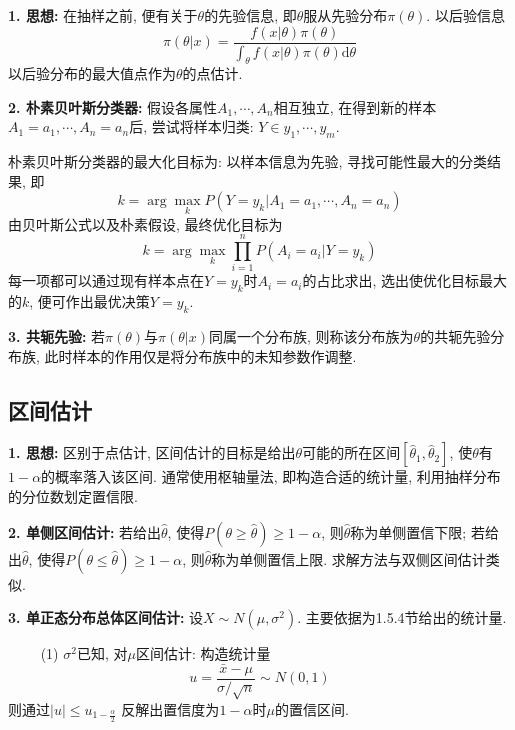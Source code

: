 \textbf{1. 思想: }在抽样之前, 便有关于$\theta$的先验信息, 即$\theta$服从先验分布$\pi(\theta)$. 以后验信息
\begin{equation*}
    \pi(\theta|x)=\frac{f(x|\theta)\pi(\theta)}{\int_\theta f(x|\theta)\pi(\theta)\mathrm{d} \theta}
\end{equation*}
以后验分布的最大值点作为$\theta$的点估计.

\textbf{2. 朴素贝叶斯分类器: }假设各属性$A_1,\cdots,A_n$相互独立, 在得到新的样本$A_1=a_1,\cdots,A_n=a_n$后, 尝试将样本归类: $Y \in {y_1,\cdots,y_m}$.

朴素贝叶斯分类器的最大化目标为: 以样本信息为先验, 寻找可能性最大的分类结果, 即
\begin{equation*}
    k=\arg\max\limits_{k}P(Y=y_k|A_1=a_1,\cdots,A_n=a_n)
\end{equation*}
由贝叶斯公式以及朴素假设, 最终优化目标为
\begin{equation*}
    k=\arg\max\limits_{k} \prod\limits_{i=1}^n P(A_i=a_i|Y=y_k)
\end{equation*}
每一项都可以通过现有样本点在$Y=y_k$时$A_i=a_i$的占比求出, 选出使优化目标最大的$k$, 便可作出最优决策$Y=y_k$.

\textbf{3. 共轭先验: }若$\pi(\theta)$与$\pi(\theta|x)$同属一个分布族, 则称该分布族为$\theta$的共轭先验分布族, 此时样本的作用仅是将分布族中的未知参数作调整.

\subsection{区间估计}

\textbf{1. 思想: }区别于点估计, 区间估计的目标是给出$\theta$可能的所在区间$[\hat{\theta}_1,\hat{\theta}_2]$, 使$\theta$有$1-\alpha$的概率落入该区间. 通常使用枢轴量法, 即构造合适的统计量, 利用抽样分布的分位数划定置信限.

\textbf{2. 单侧区间估计: }若给出$\hat{\theta}$, 使得$P(\theta \geq \hat{\theta})\geq 1-\alpha$, 则$\hat{\theta}$称为单侧置信下限; 若给出$\hat{\theta}$, 使得$P(\theta \leq \hat{\theta})\geq 1-\alpha$, 则$\hat{\theta}$称为单侧置信上限. 求解方法与双侧区间估计类似.

\textbf{3. 单正态分布总体区间估计: }设$X \sim N(\mu, \sigma^2)$. 主要依据为1.5.4节给出的统计量.

~~~~ (1) $\sigma^2$已知, 对$\mu$区间估计: 构造统计量
\begin{equation*}
    u=\frac{\bar{x}-\mu}{\sigma/\sqrt{n}} \sim N(0,1)
\end{equation*}
则通过$|u| \leq u_{1-\frac{\alpha}{2}}$ 反解出置信度为$1-\alpha$时$\mu$的置信区间.

